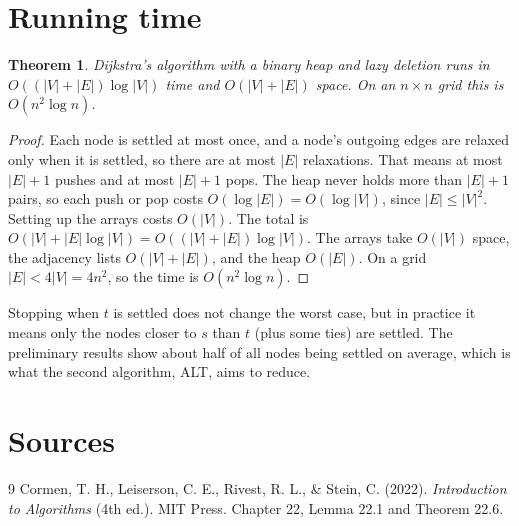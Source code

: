 \documentclass[11pt]{article}
\newtheorem{theorem}{Theorem}
\begin{document}
\section{Running time}

\begin{theorem}\label{thm:time}
Dijkstra's algorithm with a binary heap and lazy deletion runs in $O((|V|+|E|)\log|V|)$ time and $O(|V|+|E|)$ space. On an $n\times n$ grid this is $O(n^2\log n)$.
\end{theorem}
\begin{proof}
Each node is settled at most once, and a node's outgoing edges are relaxed only when it is settled, so there are at most $|E|$ relaxations. That means at most $|E|+1$ pushes and at most $|E|+1$ pops. The heap never holds more than $|E|+1$ pairs, so each push or pop costs $O(\log|E|)=O(\log|V|)$, since $|E|\le|V|^2$. Setting up the arrays costs $O(|V|)$. The total is $O(|V|+|E|\log|V|)=O((|V|+|E|)\log|V|)$. The arrays take $O(|V|)$ space, the adjacency lists $O(|V|+|E|)$, and the heap $O(|E|)$. On a grid $|E|<4|V|=4n^2$, so the time is $O(n^2\log n)$.
\end{proof}

Stopping when $t$ is settled does not change the worst case, but in practice it means only the nodes closer to $s$ than $t$ (plus some ties) are settled. The preliminary results show about half of all nodes being settled on average, which is what the second algorithm, ALT, aims to reduce.

\section*{Sources}
\begin{thebibliography}{9}
 Cormen, T. H., Leiserson, C. E., Rivest, R. L., \& Stein, C. (2022). \emph{Introduction to Algorithms} (4th ed.). MIT Press. Chapter 22, Lemma 22.1 and Theorem 22.6.
\end{thebibliography}
\end{document}
